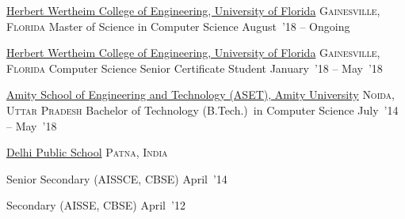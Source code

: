\documentclass[10pt,a4paper]{article}
\begin{document}
\headedsection
  {\href{}{Herbert Wertheim College of Engineering, University of Florida}}
  {\textsc{Gainesville, Florida}} {%
  \headedsubsection
    {Master of Science in Computer Science }
    {August~'18 -- Ongoing} {}
}

\headedsection
  {\href{}{Herbert Wertheim College of Engineering, University of Florida}}
  {\textsc{Gainesville, Florida}} {%
  \headedsubsection
    {Computer Science Senior Certificate Student}
    {January~'18 -- May~'18} {}
}

\headedsection
  {\href{}{Amity School of Engineering and Technology (ASET), Amity University}}
  {\textsc{Noida, Uttar Pradesh}} {%
  \headedsubsection
    {Bachelor of Technology (B.Tech.)~in Computer Science}
    {July~'14 -- May~'18} {}
}



\headedsection
{\href{}{Delhi Public School}}
{\textsc{Patna, India}} {%
  \headedsubsection
  {Senior Secondary (AISSCE, CBSE)}
  {April~'14} {}

  \headedsubsection
  {Secondary (AISSE, CBSE)}
  {April~'12} {}
  
}

\spacedhrule{0.5em}{-0.4em}
\end{document}
